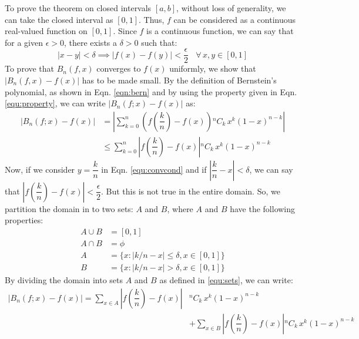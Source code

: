 \documentclass[
]{book}
\begin{document}
To prove the theorem on closed intervals \([a,b]\), without loss of generality, we can take the closed interval as \([0, 1]\). Thus, \(f\) can be considered as a continuous real-valued function on \([0, 1]\). Since \(f\) is a continuous function, we can say that for a given \(\epsilon > 0\), there exists a \(\delta > 0\) such that:
\begin{equation}
    |x-y| < \delta \implies |f(x) - f(y)| <\frac{\epsilon}{2} \ \ \ \  \forall \, x,y \in [0,1]
    \label{equ:convcond}
\end{equation}
To prove that \(B_n(f,x)\) converges to \(f(x)\) uniformly, we show that \(|B_n(f,x) - f(x)|\) has to be made small. By the definition of Bernstein's polynomial, as shown in Eqn. \ref{eqn:bern} and by using the property given in Eqn. \ref{equ:property}, we can write \(|B_n(f;x) - f(x)|\) as:
\begin{align*}
    |B_n(f;x) - f(x)| &= \left| \sum_{k=0}^n {\left(f\left(\dfrac{k}{n}\right) - f(x)\right) {}^nC_{k} \, x^k (1-x)^{n-k}} \right| \\
    &\leq \sum_{k=0}^n {\left|f\left(\dfrac{k}{n}\right) - f(x)\right| {}^nC_{k} \, x^k (1-x)^{n-k}}
\end{align*}
Now, if we consider \(y=\dfrac{k}{n}\) in Eqn. \ref{equ:convcond} and if \(\left|\dfrac{k}{n} - x\right| < \delta\), we can say that \(\left|f\left(\dfrac{k}{n}\right) - f(x)\right| < \dfrac{\epsilon}{2}\). But this is not true in the entire domain. So, we partition the domain in to two sets: \(A\) and \(B\), where \(A\) and \(B\) have the following properties:
\begin{equation}
    \begin{aligned}
        A \cup B &= [0,1]\\
        A \cap B &= \phi\\
        A &= \{x:|k/n - x| \leq \delta, x \in [0,1]\}\\
        B &= \{x:|k/n-x| > \delta, x \in [0,1]\}
    \end{aligned}
    \label{equ:sets}
\end{equation}
By dividing the domain into sets \(A\) and \(B\) as defined in \ref{equ:sets}, we can write:
\begin{equation*}
\begin{split}
    |B_n(f;x) - f(x)| = \sum_{x\in A} \left|f\left(\dfrac{k}{n}\right) - f(x)\right| &{}^nC_{k}\, x^k (1-x)^{n-k} \\
    &+ \sum_{x\in B} \left|f\left(\dfrac{k}{n}\right) - f(x)\right |{}^nC_{k}\, x^k (1-x)^{n-k}
\end{split}
\end{equation*}
\end{document}
